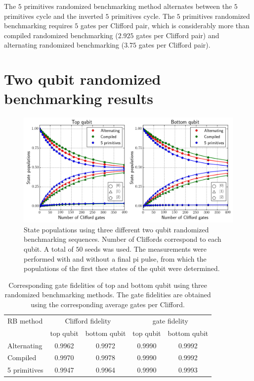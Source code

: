         The $5$ primitives randomized benchmarking method alternates between the $5$ primitives cycle and the inverted $5$ primitives cycle. The $5$ primitives randomized benchmarking requires $5$ gates per Clifford pair, which is considerably more than compiled randomized benchmarking ($2.925$ gates per Clifford pair) and alternating randomized benchmarking ($3.75$ gates per Clifford pair).

        \section{Two qubit randomized benchmarking results}
          \label{Two qubit randomized benchmarking results}

          \begin{figure}[tb]
            \centering
            \includegraphics[width=\textwidth]{../Figures/Randomized benchmarking/RB_2Q_state_populations_notable.png}
            \caption{State populations using three different two qubit randomized benchmarking sequences. Number of Cliffords correspond to each qubit. A total of $50$ seeds was used. The measurements were performed with and without a final pi pulse, from which the populations of the first thee states of the qubit were determined.}
            \label{fig:RB 2Q state populations}
          \end{figure}

      \begin{table}
        \begin{tabular}{l c c c c}
          \toprule
          RB method     & \multicolumn{2}{c}{Clifford fidelity} & \multicolumn{2}{c}{gate fidelity}\\
          \cmidrule(lr){2-3}
          \cmidrule(lr){4-5}
                        & top qubit & bottom qubit & top qubit & bottom qubit \\
          \midrule
          Alternating   & 0.9962 & 0.9972 & 0.9990 & 0.9992 \\
          Compiled      & 0.9970 & 0.9978 & 0.9990 & 0.9992 \\
          5 primitives  & 0.9947 & 0.9964 & 0.9990 & 0.9993 \\
          \bottomrule
        \end{tabular}
        \caption{Corresponding gate fidelities of top and bottom qubit using three randomized benchmarking methods. The gate fidelities are obtained using the corresponding average gates per Clifford.}
        \label{tab:RB 2Q converted gate fidelities}
      \end{table}

